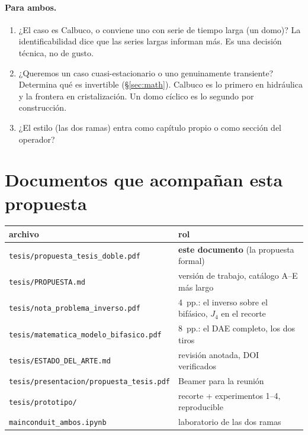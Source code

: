 \documentclass[11pt,a4paper]{article}
\theoremstyle{plain}
\theoremstyle{definition}
\theoremstyle{remark}
\begin{document}
\paragraph{Para ambos.}
\begin{enumerate}
\item ¿El caso es Calbuco, o conviene uno con serie de tiempo
  larga (un domo)? La identificabilidad dice que las series
  largas informan más. Es una decisión técnica, no de gusto.
\item ¿Queremos un caso cuasi-estacionario o uno genuinamente
  transiente? Determina qué es invertible
  (\S\ref{sec:math}). Calbuco es lo primero en hidráulica y la
  frontera en cristalización. Un domo cíclico es lo segundo
  por construcción.
\item ¿El estilo (las dos ramas) entra como capítulo propio o
  como sección del operador?
\end{enumerate}

\section{Documentos que acompañan esta propuesta}

\begin{center}
\small
\begin{tabular}{@{}ll@{}}
\toprule
archivo & rol \\
\midrule
\texttt{tesis/propuesta\_tesis\_doble.pdf} &
  \textbf{este documento} (la propuesta formal) \\
\texttt{tesis/PROPUESTA.md} &
  versión de trabajo, catálogo A--E más largo \\
\texttt{tesis/nota\_problema\_inverso.pdf} &
  4~pp.: el inverso sobre el bifásico, $J_4$ en el recorte \\
\texttt{tesis/matematica\_modelo\_bifasico.pdf} &
  8~pp.: el DAE completo, los dos tiros \\
\texttt{tesis/ESTADO\_DEL\_ARTE.md} &
  revisión anotada, DOI verificados \\
\texttt{tesis/presentacion/propuesta\_tesis.pdf} &
  Beamer para la reunión \\
\texttt{tesis/prototipo/} &
  recorte + experimentos 1--4, reproducible \\
\texttt{mainconduit\_ambos.ipynb} &
  laboratorio de las dos ramas \\
\bottomrule
\end{tabular}
\end{center}
\end{document}
